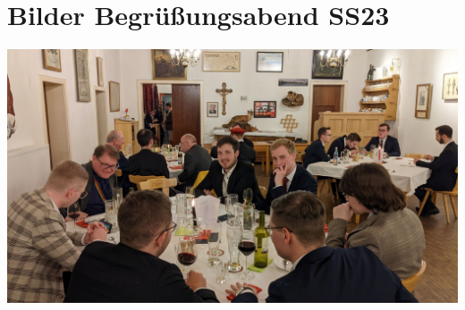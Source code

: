 \section{Bilder Begrüßungsabend SS23}



\begin{center}
\begin{figurehere}
		
			\includegraphics[width=.9\linewidth]{Bilder/begrüßungsabendss23/begrüßungsabend (2).jpg}
		
		   
		    
	\end{figurehere}
\end{center}
	
	
	

	

%
